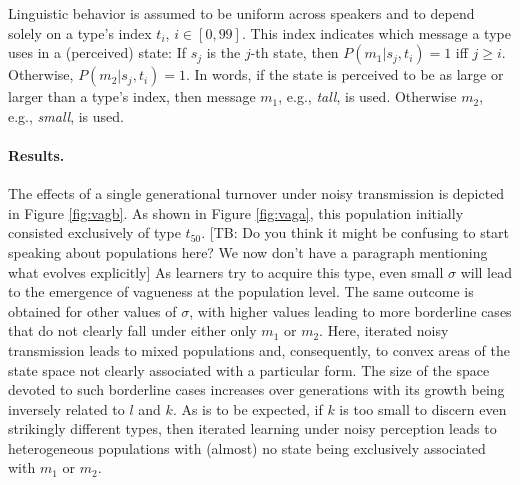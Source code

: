 \documentclass[10pt,a4paper]{article}
\newcommand{\tb}[1]{\textcolor[rgb]{.8,.33,.0}{[TB: #1]}}%
\begin{document}
Linguistic behavior is assumed to be uniform across speakers and to depend solely on a type's index $t_i$, $i \in [0,99]$. This index indicates which message a type uses in a (perceived) state: If $s_j$ is the $j$-th state, then $P(m_1|s_j,t_i) = 1$ iff $j \geq i$. Otherwise, $P(m_2|s_j,t_i) = 1$. In words, if the state is perceived to be as large or larger than a type's index, then message $m_1$, e.g., {\em tall}, is used. Otherwise $m_2$, e.g., {\em small}, is used.

\paragraph{Results.} The effects of a single generational turnover under noisy transmission is depicted in Figure \ref{fig:vagb}. As shown in Figure \ref{fig:vaga}, this population initially consisted exclusively of type $t_{50}$. \tb{Do you think it might be confusing to start speaking about populations here? We now don't have a paragraph mentioning what evolves explicitly} As learners try to acquire this type, even small $\sigma$ will lead to the emergence of vagueness at the population level. The same outcome is obtained for other values of $\sigma$, with higher values leading to more borderline cases that do not clearly fall under either only $m_1$ or $m_2$. Here, iterated noisy transmission leads to mixed populations and, consequently, to convex areas of the state space not clearly associated with a particular form. The size of the space devoted to such borderline cases increases over generations with its growth being inversely related to $l$ and $k$. As is to be expected, if $k$ is too small to discern even strikingly different types, then iterated learning under noisy perception leads to heterogeneous populations with (almost) no state being exclusively associated with $m_1$ or $m_2$.
\end{document}
